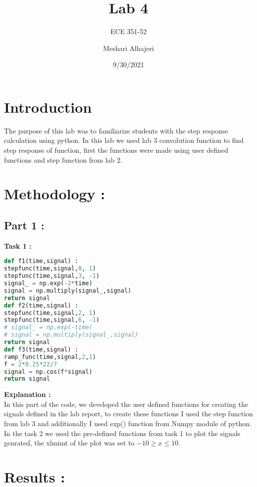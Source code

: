\documentclass[11pt]{article}
\title{Lab 4}
\author{ECE 351-52}
\author{Meshari Alhajeri}
\date{9/30/2021}
\newcommand{\rr}{\mathbb{R}}
\DeclareMathOperator{\conv}{conv}
\begin{document}
\maketitle



\section{Introduction}\label{section-introduction}

The purpose of this lab was to familiarize students with the step response calculation using python. In this lab we used lab 3 convolution function to find step response of function, first the functions were made using user defined functions and step function from lab 2.%

\section{Methodology :}\label{section-introduction}

\subsection{Part 1 :}
{\bf Task 1 : }


\begin{lstlisting}[language=Python, caption=Part 1(Task 1)]
def f1(time,signal) :
stepfunc(time,signal,0, 1)
stepfunc(time,signal,3, -1)
signal_ = np.exp(-2*time)
signal = np.multiply(signal_,signal)
return signal
def f2(time,signal) :
stepfunc(time,signal,2, 1)
stepfunc(time,signal,6, -1)
# signal_ = np.exp(-time)
# signal = np.multiply(signal_,signal)
return signal
def f3(time,signal) :
ramp_func(time,signal,2,1)
f = 2*0.25*22/7
signal = np.cos(f*signal)
return signal
\end{lstlisting}

{\bf Explanation : }
\\In this part of the code, we developed the user defined functions for creating the signals defined in the lab report, to create these functions I used the step function from lab 3 and additionally I used exp() function from Numpy module of python. 
In the task 2 we used the pre-defined functions from task 1 to plot the signals genrated, the xlmimt of the plot was set to $-10 \geq x \leq 10.$

\section{Results : }
\end{document}
